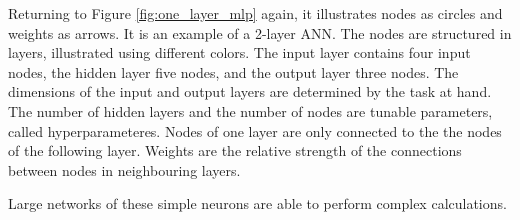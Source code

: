 Returning to Figure \ref{fig:one_layer_mlp} again, it illustrates nodes as circles and weights as arrows. It is an example of a 2-layer ANN. The nodes are structured in layers, illustrated using different colors. The input layer contains four input nodes, the hidden layer five nodes, and the output layer three nodes. The dimensions of the input and output layers are determined by the task at hand. The number of hidden layers and the number of nodes are tunable parameters, called hyperparameteres. Nodes of one layer are only connected to the the nodes of the following layer. Weights are the relative strength of the connections between nodes in neighbouring layers.

Large networks of these simple neurons are able to perform complex calculations. 


